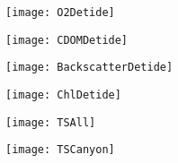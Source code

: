 \documentclass[11pt]{article}
\newcommand{\twowidth}{6in}
\begin{document}
\begin{figure*}[htbp]
  \begin{center}
    \texttt{[image: O2Detide]}
    \caption{
      \label{fig:O2Detide} }
  \end{center}
\end{figure*}

\begin{figure*}[htbp]
  \begin{center}
    \texttt{[image: CDOMDetide]}
    \caption{
      \label{fig:CDOMDetide} }
  \end{center}
\end{figure*}

\begin{figure*}[htbp]
  \begin{center}
    \texttt{[image: BackscatterDetide]}
    \caption{
      \label{fig:BackscatterDetide} }
  \end{center}
\end{figure*}

\begin{figure*}[htbp]
  \begin{center}
    \texttt{[image: ChlDetide]}
    \caption{
            \label{fig:ChlDetide} }
  \end{center}
\end{figure*}

\begin{figure*}[htbp]
  \begin{center}
    \texttt{[image: TSAll]}
    \caption{
      \label{fig:TSAll} }
  \end{center}
\end{figure*}

\begin{figure*}[htbp]
  \begin{center}
    \texttt{[image: TSCanyon]}
    \caption{
      \label{fig:TSCanyon} }
  \end{center}
\end{figure*}


\clearpage
\end{document}
